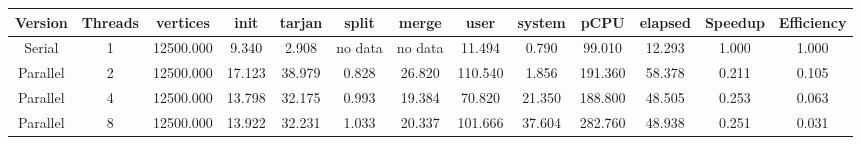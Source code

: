 \begin{tabular}{|c|c|c|c|c|c|c|c|c|c|c|c|c|}
\toprule
 Version &  Threads &  vertices &   init &  tarjan &   split &   merge &    user &  system &    pCPU &  elapsed &  Speedup &  Efficiency \\
\midrule
  Serial &        1 & 12500.000 &  9.340 &   2.908 & no data & no data &  11.494 &   0.790 &  99.010 &   12.293 &    1.000 &       1.000 \\
Parallel &        2 & 12500.000 & 17.123 &  38.979 &   0.828 &  26.820 & 110.540 &   1.856 & 191.360 &   58.378 &    0.211 &       0.105 \\
Parallel &        4 & 12500.000 & 13.798 &  32.175 &   0.993 &  19.384 &  70.820 &  21.350 & 188.800 &   48.505 &    0.253 &       0.063 \\
Parallel &        8 & 12500.000 & 13.922 &  32.231 &   1.033 &  20.337 & 101.666 &  37.604 & 282.760 &   48.938 &    0.251 &       0.031 \\
\bottomrule
\end{tabular}
